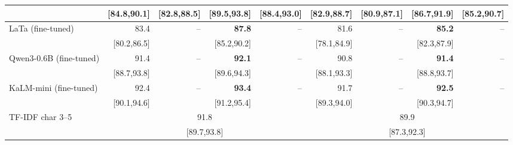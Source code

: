 \begin{table}[t]
\begin{tabular}{lrrrrrrrr}
 & {\scriptsize [84.8,90.1]} & {\scriptsize [82.8,88.5]} & {\scriptsize [89.5,93.8]} & {\scriptsize [88.4,93.0]} & {\scriptsize [82.9,88.7]} & {\scriptsize [80.9,87.1]} & {\scriptsize [86.7,91.9]} & {\scriptsize [85.2,90.7]} \\
\midrule
LaTa (fine-tuned) & 83.4 & -- & \textbf{87.8} & -- & 81.6 & -- & \textbf{85.2} & -- \\
 & {\scriptsize [80.2,86.5]} &  & {\scriptsize [85.2,90.2]} &  & {\scriptsize [78.1,84.9]} &  & {\scriptsize [82.3,87.9]} &  \\
Qwen3-0.6B (fine-tuned) & 91.4 & -- & \textbf{92.1} & -- & 90.8 & -- & \textbf{91.4} & -- \\
 & {\scriptsize [88.7,93.8]} &  & {\scriptsize [89.6,94.3]} &  & {\scriptsize [88.1,93.3]} &  & {\scriptsize [88.8,93.7]} &  \\
KaLM-mini (fine-tuned) & 92.4 & -- & \textbf{93.4} & -- & 91.7 & -- & \textbf{92.5} & -- \\
 & {\scriptsize [90.1,94.6]} &  & {\scriptsize [91.2,95.4]} &  & {\scriptsize [89.3,94.0]} &  & {\scriptsize [90.3,94.7]} &  \\
TF-IDF char 3--5 & \multicolumn{4}{c}{91.8} & \multicolumn{4}{c}{89.9} \\
 & \multicolumn{4}{c}{{\scriptsize [89.7,93.8]}} & \multicolumn{4}{c}{{\scriptsize [87.3,92.3]}} \\
\bottomrule
\end{tabular}

\end{table}
